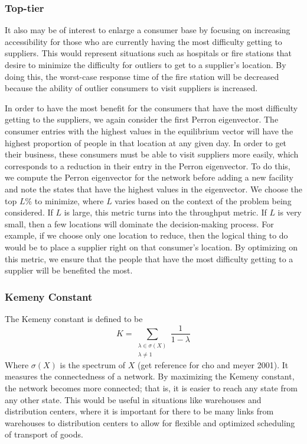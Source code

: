 \documentclass[twoside,twocolumn]{article}
\begin{document}
\subsubsection{Top-tier}
It also may be of interest to enlarge a consumer base by focusing on increasing accessibility for those who are currently having the most difficulty getting to suppliers.
This would represent situations such as hospitals or fire stations that desire to minimize the difficulty for outliers to get to a supplier's location.
By doing this, the worst-case response time of the fire station will be decreased because the ability of outlier consumers to visit suppliers is increased.

In order to have the most benefit for the consumers that have the most difficulty getting to the suppliers, we again consider the first Perron eigenvector.
The consumer entries with the highest values in the equilibrium vector will have the highest proportion of people in that location at any given day.
In order to get their business, these consumers must be able to visit suppliers more easily, which corresponds to a reduction in their entry in the Perron eigenvector.
To do this, we compute the Perron eigenvector for the network before adding a new facility and note the states that have the highest values in the eigenvector.
We choose the top $L$\% to minimize, where $L$ varies based on the context of the problem being considered.
If $L$ is large, this metric turns into the throughput metric.
If $L$ is very small, then a few locations will dominate the decision-making process.
For example, if we choose only one location to reduce, then the logical thing to do would be to place a supplier right on that consumer's location.
By optimizing on this metric, we ensure that the people that have the most difficulty getting to a supplier will be benefited the most.

\subsubsection{Kemeny Constant}
The Kemeny constant is defined to be 
$$K = \sum_{\substack{\lambda \in \sigma(X) \\ \lambda \neq 1}} \frac{1}{1-\lambda}$$
Where $\sigma(X)$ is the spectrum of $X$ (get reference for cho and meyer 2001).
It measures the connectedness of a network.
By maximizing the Kemeny constant, the network becomes more connected; that is, it is easier to reach any state from any other state.
This would be useful in situations like warehouses and distribution centers, where it is important for there to be many links from warehouses to distribution centers to allow for flexible and optimized scheduling of transport of goods.
\end{document}
